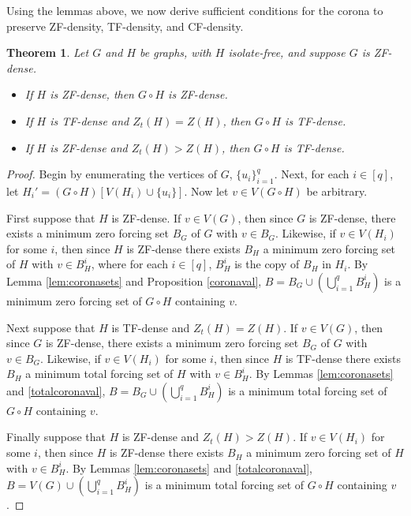 \documentclass[11pt]{article}
\newtheorem{thm}{Theorem}
\theoremstyle{definition}
\newcommand{\1}{\vspace{0.1cm}}
\newcommand{\2}{\vspace{0.2cm}}
\newcommand{\3}{\vspace{0.3cm}}
\begin{document}
Using the lemmas above, we now derive sufficient conditions for the corona to preserve ZF-density, TF-density, and CF-density. 

\begin{thm}
\label{thmcortfzf}
Let $G$ and $H$ be graphs, with $H$ isolate-free, and suppose $G$ is ZF-dense.
\begin{itemize}
\item If $H$ is ZF-dense, then $G \circ H$ is ZF-dense.
\item If $H$ is TF-dense and $Z_t(H)=Z(H)$, then $G \circ H$ is TF-dense.
\item If $H$ is ZF-dense and $Z_t(H)>Z(H)$, then $G \circ H$ is TF-dense.
\end{itemize}
\end{thm}

\begin{proof}
Begin by enumerating the vertices of $G$, $\{u_i\}_{i=1}^q$.  Next, for each $i \in [q]$, let $H_i'=(G \circ H)[V(H_i) \cup \{u_i\}]$.  Now let $v \in V(G \circ H)$ be arbitrary.

First suppose that $H$ is ZF-dense.  If $v \in V(G)$, then since $G$ is ZF-dense, there exists a minimum zero forcing set $B_G$ of $G$ with $v \in B_G$.  Likewise, if $v \in V(H_i)$ for some $i$, then since $H$ is ZF-dense there exists $B_H$ a minimum zero forcing set of $H$ with $v \in B_H^i$, where for each $i \in [q]$, $B_H^i$ is the copy of $B_H$ in $H_i$.  By Lemma \ref{lem:coronasets} and Proposition \ref{coronaval}, $B=B_G \cup (\bigcup_{i=1}^{q}B_H^i)$ is a minimum zero forcing set of $G \circ H$ containing $v$.

Next suppose that $H$ is TF-dense and $Z_t(H)=Z(H)$.  If $v \in V(G)$, then since $G$ is ZF-dense, there exists a minimum zero forcing set $B_G$ of $G$ with $v \in B_G$.  Likewise, if $v \in V(H_i)$ for some $i$, then since $H$ is TF-dense there exists $B_H$ a minimum total forcing set of $H$ with $v \in B_H^i$.  By Lemmas \ref{lem:coronasets} and \ref{totalcoronaval}, $B=B_G \cup (\bigcup_{i=1}^{q}B_H^i)$ is a minimum total forcing set of $G \circ H$ containing $v$.

Finally suppose that $H$ is ZF-dense and $Z_t(H)>Z(H)$.  If $v \in V(H_i)$ for some $i$, then since $H$ is ZF-dense there exists $B_H$ a minimum zero forcing set of $H$ with $v \in B_H^i$.  By Lemmas \ref{lem:coronasets} and \ref{totalcoronaval}, $B=V(G) \cup (\bigcup_{i=1}^{q}B_H^i)$ is a minimum total forcing set of $G \circ H$ containing $v$.
\end{proof}
\end{document}
